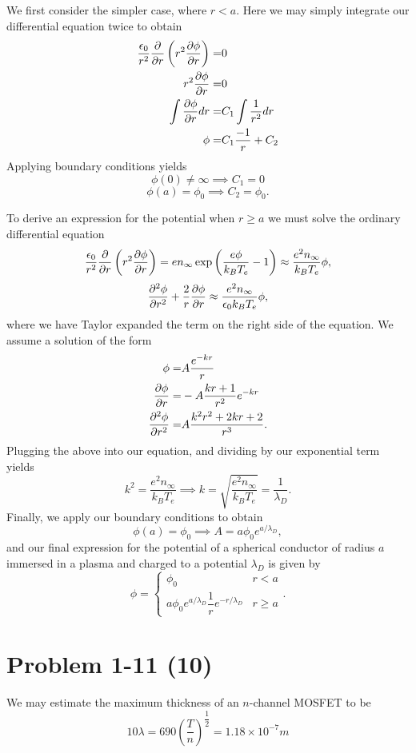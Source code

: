 We first consider the simpler case, where \(r < a\). Here we may simply integrate our differential equation twice to obtain
\begin{align*}
	\dfrac{\epsilon_0}{r^2} \dfrac{\partial}{\partial r} \left(r^2\frac{\partial \phi}{\partial r}\right) =& 0 \\
	r^2\frac{\partial \phi}{\partial r} =& 0 \\
	\int \frac{\partial \phi}{\partial r} dr =& C_1\int \dfrac{1}{r^2}dr \\ 
	\phi =& C_1 \dfrac{-1}{r} + C_2
\end{align*}
Applying boundary conditions yields
\begin{equation}
	\phi(0) \neq \infty \implies C_1 = 0
\end{equation}
\begin{equation}
	\phi(a) = \phi_0 \implies C_2 = \phi_0.
\end{equation}

To derive an expression for the potential when \(r \geq a\) we must solve the ordinary differential equation
\begin{equation}
	\dfrac{\epsilon_0}{r^2} \dfrac{\partial}{\partial r} \left(r^2\frac{\partial \phi}{\partial r}\right)  = 
	en_\infty\exp{\left(\dfrac{e\phi}{k_BT_e}-1\right)} \approx \dfrac{e^2n_\infty}{k_BT_e}\phi,
\end{equation}
\begin{equation}
\dfrac{\partial^2 \phi}{\partial r^2} +  \dfrac{2}{r}\frac{\partial \phi}{\partial r} \approx \dfrac{e^2n_\infty}{\epsilon_0k_BT_e}\phi,
\end{equation}
where we have Taylor expanded the term on the right side of the equation. We assume a solution of the form
\begin{align*}
	\phi =& A\dfrac{e^{-kr}}{r} \\
	\frac{\partial \phi}{\partial r} =& -A\dfrac{kr + 1}{r^2}e^{-kr} \\
	\dfrac{\partial^2\phi}{\partial r^2} =& A\dfrac{k^2r^2 + 2kr + 2}{r^3}.
\end{align*}
Plugging the above into our equation, and dividing by our exponential term yields
\begin{equation}
	k^2 = \dfrac{e^2n_\infty}{k_BT_e} \implies k = \sqrt{\dfrac{e^2n_\infty}{k_BT_e}} = \dfrac{1}{\lambda_D}.
\end{equation}
Finally, we apply our boundary conditions to obtain
\begin{equation}
	\phi(a) = \phi_0 \implies A = a\phi_0e^{a/\lambda_D},
\end{equation}
and our final expression for the potential of a spherical conductor of radius \(a\) immersed in a plasma and charged to a potential \(\lambda_D \) is given by
\begin{equation}
	\phi = \begin{cases}
	\phi_0 & r < a \\
	a\phi_0e^{a/\lambda_D}\dfrac{1}{r}e^{-r/\lambda_D} & r \geq a
	\end{cases}.
\end{equation}

\section*{Problem 1-11 (10)}
\label{sec:1-11}
We may estimate the maximum thickness of an \(n\)-channel MOSFET to be 
\begin{equation}
	10\lambda = 690(\dfrac{T}{n})^{\dfrac{1}{2}} = 1.18\times10^{-7}m
\end{equation}